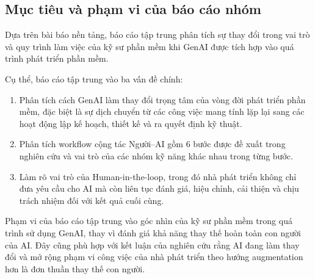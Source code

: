 \subsection{Mục tiêu và phạm vi của báo cáo nhóm}

Dựa trên bài báo nền tảng, báo cáo tập trung phân tích sự thay đổi trong vai trò và quy trình làm việc của kỹ sư phần mềm khi GenAI được tích hợp vào quá trình phát triển phần mềm.

Cụ thể, báo cáo tập trung vào ba vấn đề chính:
\begin{enumerate}
    \item Phân tích cách GenAI làm thay đổi trọng tâm của vòng đời phát triển phần mềm, đặc biệt là sự dịch chuyển từ các công việc mang tính lặp lại sang các hoạt động lập kế hoạch, thiết kế và ra quyết định kỹ thuật.
    \item Phân tích workflow cộng tác Người–AI gồm 6 bước được đề xuất trong nghiên cứu và vai trò của các nhóm kỹ năng khác nhau trong từng bước.
    \item Làm rõ vai trò của Human-in-the-loop, trong đó nhà phát triển không chỉ đưa yêu cầu cho AI mà còn liên tục đánh giá, hiệu chỉnh, cải thiện và chịu trách nhiệm đối với kết quả cuối cùng.
\end{enumerate}

Phạm vi của báo cáo tập trung vào góc nhìn của kỹ sư phần mềm trong quá trình sử dụng GenAI, thay vì đánh giá khả năng thay thế hoàn toàn con người của AI. Đây cũng phù hợp với kết luận của nghiên cứu rằng AI đang làm thay đổi và mở rộng phạm vi công việc của nhà phát triển theo hướng augmentation hơn là đơn thuần thay thế con người.
